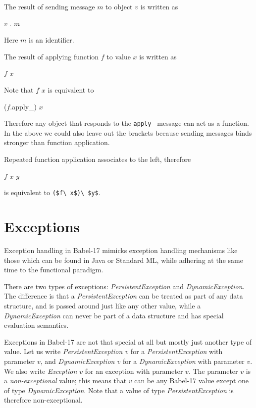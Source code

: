 \documentclass[11pt]{amsart}
\newcommand{\metababel}[1] {\textsl{#1}}
\newcommand{\babelsrc}[1] {\lstinline!#1!}
\begin{document}
The result of sending message $m$ to object $v$  is written as
\begin{babellisting}
$v$ . $m$
\end{babellisting}
Here $m$ is an identifier.

The result of applying function $f$ to value $x$ is written as 
\begin{babellisting}
$f$ $x$
\end{babellisting}
Note that $f$ $x$ is equivalent to 
\begin{babellisting}
($f$.apply_) $x$
\end{babellisting}
Therefore any object that responds to the \babelsrc{apply_} message can act as a function.
In the above we could also leave out the brackets because sending messages binds stronger than function application. 

Repeated function application associates to the left, therefore 
\begin{babellisting}
$f$ $x$ $y$ 
\end{babellisting} 
is equivalent to \babelsrc{($f\ x$)\ $y$}.

\section{Exceptions}
Exception handling in Babel-17 mimicks exception handling mechanisms like those which can be found in Java or Standard ML, while adhering at the same time to the functional paradigm.

There are two types of exceptions: \metababel{PersistentException} and  \metababel{DynamicException}.
The difference is that a \metababel{PersistentException}  can be treated as part of any data structure, and is passed around just like any other value, while a \metababel{DynamicException} can never be part of a data structure and has special evaluation semantics. 

Exceptions in Babel-17 are not that special at all but mostly just another type of value.  Let us write \metababel{PersistentException $v$} for a \metababel{PersistentException} with parameter $v$,
and  \metababel{DynamicException $v$} for a \metababel{DynamicException} with parameter $v$. 
We also write \metababel{Exception $v$} for an exception with parameter $v$. The parameter $v$ is a \emph{non-exceptional} value; this means that $v$ can be any Babel-17 value except one of type \metababel{DynamicException}. Note that a value of type \metababel{PersistentException} is therefore non-exceptional.
\end{document}
